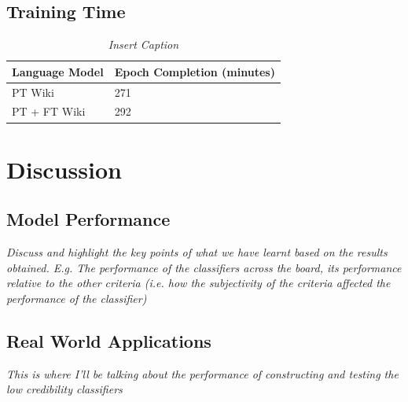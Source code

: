 \documentclass[a4paper,twoside,phd]{BYUPhys}
\begin{document}
\section{Training Time}
\label{sec:TrainingTime}

\begin{table}[H]
	\centering
	\begin{tabular}{|p{3cm}|p{5.5cm}|}
		\hline
		Language Model & Epoch Completion (minutes)                                                                                                                                                                                                                                                                                                                                                    \\
		\hline                                                                                                                                              
		
		PT Wiki  & 271  \\
		\hline
		
		PT + FT Wiki  & 292  \\
		\hline
		
		
		
	\end{tabular}
	\caption{\textit{Insert Caption}}
	\label{table:DLTrainingTime}
\end{table}


\chapter{Discussion}
\label{chap:Discussion}

\section{Model Performance}
\label{sec:ModelPerformance}
\textit{Discuss and highlight the key points of what we have learnt based on the results obtained. E.g. The performance of the classifiers across the board, its performance relative to the other criteria (i.e. how the subjectivity of the criteria affected the performance of the classifier)}

\section{Real World Applications}
\label{sec:RealWorldApplication}
\textit{This is where I'll be talking about the performance of constructing and testing the low credibility classifiers}
\end{document}
